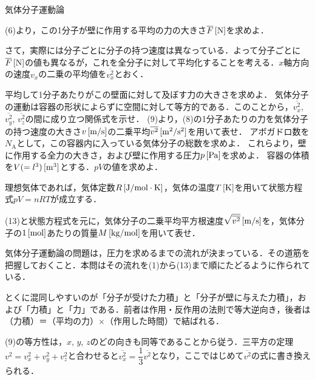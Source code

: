 \begin{reidaiunit}
\begin{reidai}{気体分子運動論}
\begin{komon}
 (6)より，この1分子が壁に作用する平均の力の大きさ$\overline{F}\,[\mathrm{N}]$を求めよ．
\end{komon}
\hspace{1zw}さて，実際には分子ごとに分子の持つ速度は異なっている．よって分子ごとに$\overline{F}\,[\mathrm{N}]$の値も異なるが，これを全分子に対して平均化することを考える．$x$軸方向の速度$v_x$の二乗の平均値を$\overline{v_x^2}$とおく．
\begin{komon}
 平均して1分子あたりがこの壁面に対して及ぼす力の大きさを求めよ．
 気体分子の運動は容器の形状によらずに空間に対して等方的である．このことから，$\overline{v_x^2}$, $\overline{v_y^2}$, $\overline{v_z^2}$の間に成り立つ関係式を示せ．
 (9)より，(8)の1分子あたりの力を気体分子の持つ速度の大きさ$v\,[\mathrm{m/s}]$の二乗平均$\overline{v^2}\,[\mathrm{m^2/s^2}]$を用いて表せ．
 アボガドロ数を$N_{\mathrm{A}}$として，この容器内に入っている気体分子の総数を求めよ．
 これらより，壁に作用する全力の大きさ，および壁に作用する圧力$p\,[\mathrm{Pa}]$を求めよ．
 容器の体積を$V(=l^3)\,[\mathrm{m^3}]$とする．$pV$の値を求めよ．
\end{komon}
\hspace{1zw}理想気体であれば，気体定数$R\,[\mathrm{J/mol\cdot K}]$，気体の温度$T\,[\mathrm{K}]$を用いて状態方程式$pV=nRT$が成立する．
\begin{komon}
 (13)と状態方程式を元に，気体分子の二乗平均平方根速度$\sqrt{\overline{v^2}}\,[\mathrm{m/s}]$を，気体分子の$1\,[\mathrm{mol}]$あたりの質量$M\,[\mathrm{kg/mol}]$を用いて表せ．
\end{komon}
\end{reidai}

\begin{sisinE}
気体分子運動論の問題は，圧力を求めるまでの流れが決まっている．その道筋を把握しておくこと．本問はその流れを(1)から(13)まで順にたどるように作られている．

とくに混同しやすいのが「分子が受けた力積」と「分子が壁に与えた力積」，および「力積」と「力」である．前者は作用・反作用の法則で等大逆向き，後者は（力積）＝（平均の力）$\times$（作用した時間）で結ばれる．

(9)の等方性は，$x$, $y$, $z$のどの向きも同等であることから従う．三平方の定理$v^2=v_x^2+v_y^2+v_z^2$と合わせると$\overline{v_x^2}=\dfrac{1}{3}\overline{v^2}$となり，ここではじめて$\overline{v^2}$の式に書き換えられる．
\end{sisinE}



\end{reidaiunit}
